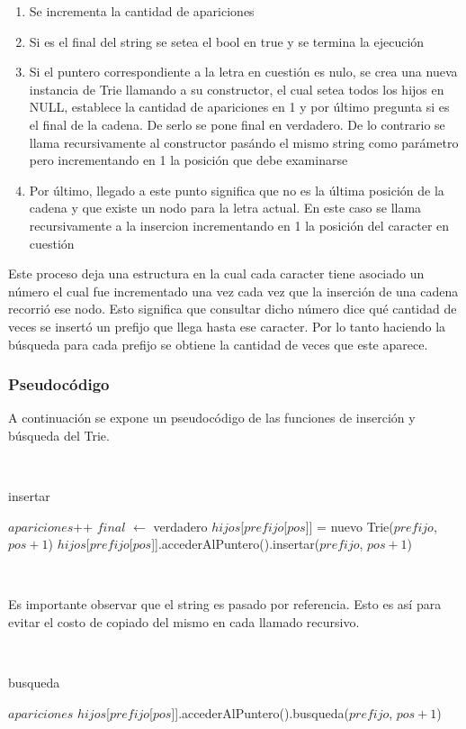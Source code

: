 \begin{enumerate}
	\item Se incrementa la cantidad de apariciones
	\item Si es el final del string se setea el bool en true y se termina la
	ejecución
	\item Si el puntero correspondiente a la letra en cuestión es nulo, se
	crea una nueva instancia de Trie llamando a su constructor, el cual setea
	todos los hijos en NULL, establece la cantidad de apariciones en 1 y por
	último pregunta si es el final de la cadena. De serlo se pone final en
	verdadero. De lo contrario se llama recursivamente al constructor pasándo
	el mismo string como parámetro pero incrementando en 1 la posición que
	debe examinarse
	\item Por último, llegado a este punto significa que no es la última
	posición de la cadena y que existe un nodo para la letra actual. En este
	caso se llama recursivamente a la insercion incrementando en 1 la
	posición del caracter en cuestión
\end{enumerate}

Este proceso deja una estructura en la cual cada caracter tiene asociado un
número el cual fue incrementado una vez cada vez que la inserción de una
cadena recorrió ese nodo. Esto significa que consultar dicho número dice
qué cantidad de veces se insertó un prefijo que llega hasta ese caracter.
Por lo tanto haciendo la búsqueda para cada prefijo se obtiene la cantidad de
veces que este aparece.

\subsubsection{Pseudocódigo}

A continuación se expone un pseudocódigo de las funciones de inserción y
búsqueda del Trie.

~

\begin{algorithm}[H]
	\caption{insertar}

	$apariciones$++ \;
	 {
		$final$ $\gets$ verdadero \;
	} {
		 {
			$hijos$[$prefijo$[$pos$]] = nuevo Trie($prefijo$, $pos + 1$) \;
		} {
			$hijos$[$prefijo$[$pos$]].accederAlPuntero().insertar($prefijo$, $pos + 1$) \;
		}
	}
\end{algorithm}

~

Es importante observar que el string es pasado por referencia. Esto es así
para evitar el costo de copiado del mismo en cada llamado recursivo.

~

\begin{algorithm}[H]
	\caption{busqueda}

	 {
		\Return $apariciones$ \;
	} {
		 {
			 \;
		} {
			\Return $hijos$[$prefijo$[$pos$]].accederAlPuntero().busqueda($prefijo$, $pos + 1$) \;
		}
	}
\end{algorithm}